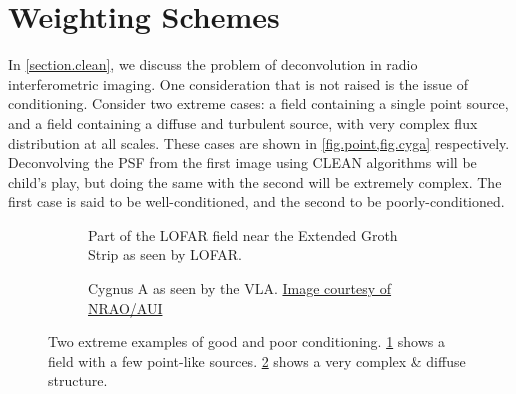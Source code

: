 \section{Weighting Schemes}
\pg
In \cref{section.clean}, we discuss the problem of deconvolution in radio interferometric imaging. One consideration that is not raised is the issue of conditioning. Consider two extreme cases: a field containing a single point source, and a field containing a diffuse and turbulent source, with very complex flux distribution at all scales. These cases are shown in \cref{fig.point,fig.cyga} respectively. Deconvolving the PSF from the first image using CLEAN algorithms will be child's play, but doing the same with the second will be extremely complex. The first case is said to be well-conditioned, and the second to be poorly-conditioned.

\begin{figure}[h!]
\centering
\begin{subfigure}{.45\textwidth}
\caption{\label{fig.point} Part of the LOFAR field near the Extended Groth Strip as seen by LOFAR.}
\end{subfigure}
\hfill
\begin{subfigure}{.53\textwidth}
\caption{\label{fig.cyga} Cygnus A as seen by the VLA. \href{http://images.nrao.edu/110}{Image courtesy of NRAO/AUI}}
\end{subfigure}
\caption{\label{fig.conditioning} Two extreme examples of good and poor conditioning. \cref{fig.point} shows a field with a few point-like sources. \cref{fig.cyga} shows a very complex \& diffuse structure.}
\end{figure}


